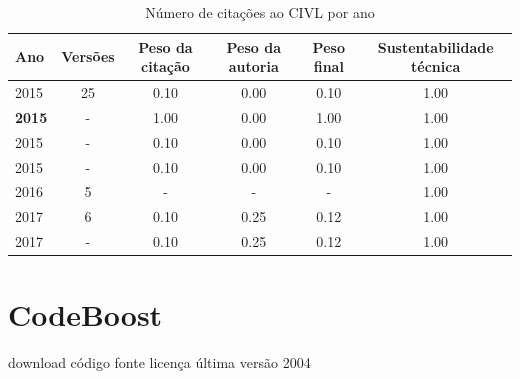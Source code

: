 \begin{table}[H]
\caption{Número de citações ao CIVL  por ano}
\centering
\begin{tabular}{| l | c | c | c | c | c |}
  \hline
  Ano & Versões & Peso da citação & Peso da autoria & Peso final & Sustentabilidade técnica \\
  \hline
            2015
          &
          25
          &
          0.10
          &
          0.00
          &
          0.10
          &
            {\color{blue} 1.00}
          \\
            {\bf 2015}
          &
          -
          &
          1.00
          &
          0.00
          &
          1.00
          &
            {\color{blue} 1.00}
          \\
            2015
          &
          -
          &
          0.10
          &
          0.00
          &
          0.10
          &
            {\color{blue} 1.00}
          \\
            2015
          &
          -
          &
          0.10
          &
          0.00
          &
          0.10
          &
            {\color{blue} 1.00}
          \\
\hline
        2016 & 5 & - & - & -
        &
          {\color{blue} 1.00}
        \\
\hline
            2017
          &
          6
          &
          0.10
          &
          0.25
          &
          0.12
          &
            {\color{blue} 1.00}
          \\
            2017
          &
          -
          &
          0.10
          &
          0.25
          &
          0.12
          &
            {\color{blue} 1.00}
          \\
\hline
\end{tabular}
\end{table}



\section{CodeBoost}
\checkmark download
\checkmark código fonte
\checkmark licença
\checkmark última versão 2004


